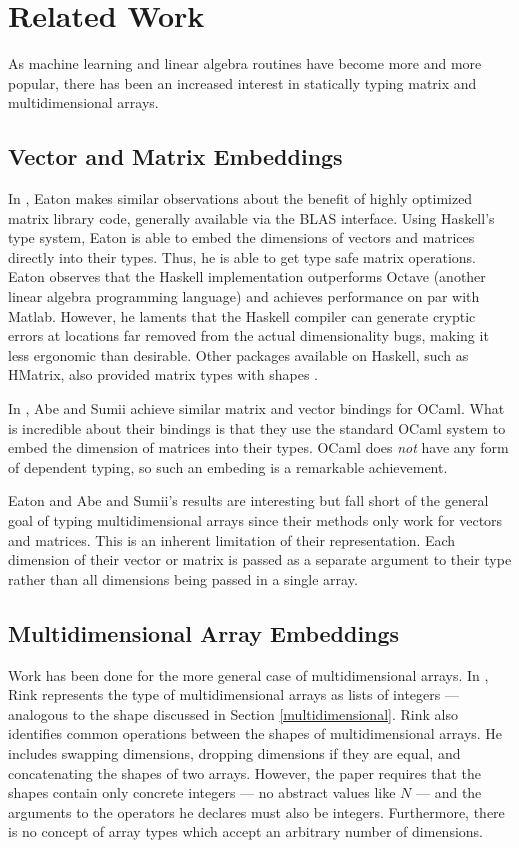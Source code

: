 \documentclass[12pt]{report}
\begin{document}
\section{Related Work}

As machine learning and linear algebra routines have become more and more popular, there has been an increased interest in statically typing matrix and multidimensional arrays.

\subsection{Vector and Matrix Embeddings}

In \cite{Eaton2006StaticallyTL}, Eaton makes similar observations about the benefit of highly optimized matrix library code, generally available via the BLAS interface. Using Haskell's type system, Eaton is able to embed the dimensions of vectors and matrices directly into their types. Thus, he is able to get type safe matrix operations. Eaton observes that the Haskell implementation outperforms Octave (another linear algebra programming language) and achieves performance on par with Matlab. However, he laments that the Haskell compiler can generate cryptic errors at locations far removed from the actual dimensionality bugs, making it less ergonomic than desirable. Other packages available on Haskell, such as HMatrix, also provided matrix types with shapes \cite{hmatrix}.

In \cite{Abe2015ASA}, Abe and Sumii achieve similar matrix and vector bindings for OCaml. What is incredible about their bindings is that they use the standard OCaml system to embed the dimension of matrices into their types. OCaml does \textit{not} have any form of dependent typing, so such an embeding is a remarkable achievement.

Eaton and Abe and Sumii's results are interesting but fall short of the general goal of typing multidimensional arrays since their methods only work for vectors and matrices. This is an inherent limitation of their representation. Each dimension of their vector or matrix is passed as a separate argument to their type rather than all dimensions being passed in a single array.

\subsection{Multidimensional Array Embeddings}

Work has been done for the more general case of multidimensional arrays. In \cite{Rink2018ModelingOL}, Rink represents the type of multidimensional arrays as lists of integers --- analogous to the shape discussed in Section \ref{multidimensional}. Rink also identifies common operations between the shapes of multidimensional arrays. He includes swapping dimensions, dropping dimensions if they are equal, and concatenating the shapes of two arrays. However, the paper requires that the shapes contain only concrete integers --- no abstract values like $N$ --- and the arguments to the operators he declares must also be integers. Furthermore, there is no concept of array types which accept an arbitrary number of dimensions.
\end{document}
